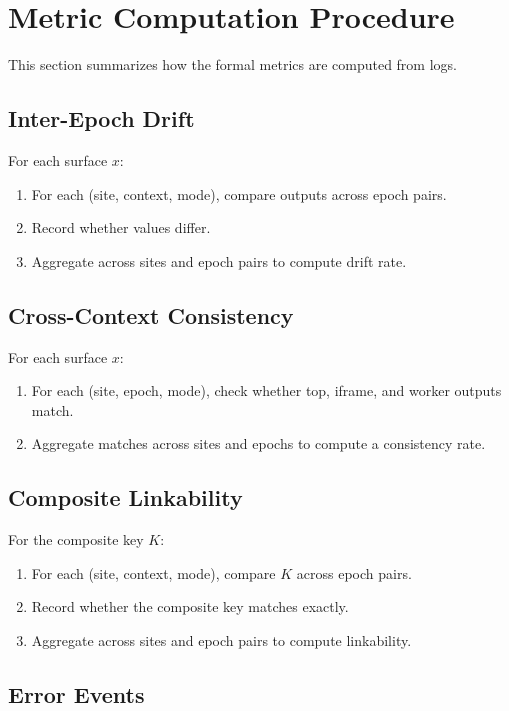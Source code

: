 \documentclass[11pt]{report}
\begin{document}
\section{Metric Computation Procedure}

This section summarizes how the formal metrics are computed from logs.

\subsection{Inter-Epoch Drift}

For each surface $x$:
\begin{enumerate}
    \item For each (site, context, mode), compare outputs across epoch pairs.
    \item Record whether values differ.
    \item Aggregate across sites and epoch pairs to compute drift rate.
\end{enumerate}

\subsection{Cross-Context Consistency}

For each surface $x$:
\begin{enumerate}
    \item For each (site, epoch, mode), check whether top, iframe, and worker outputs match.
    \item Aggregate matches across sites and epochs to compute a consistency rate.
\end{enumerate}

\subsection{Composite Linkability}

For the composite key $K$:
\begin{enumerate}
    \item For each (site, context, mode), compare $K$ across epoch pairs.
    \item Record whether the composite key matches exactly.
    \item Aggregate across sites and epoch pairs to compute linkability.
\end{enumerate}

\subsection{Error Events}
\end{document}
